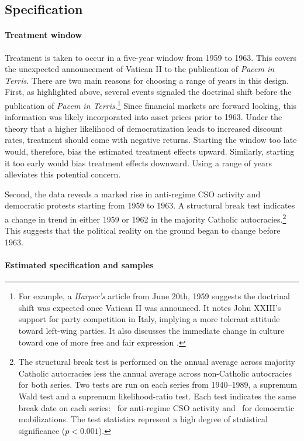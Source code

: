 \subsection{Specification}

\paragraph{Treatment window} 
Treatment is taken to occur in a five-year window from 1959 to 1963. This covers the unexpected announcement of Vatican II to the publication of \textit{Pacem in Terris}. There are two main reasons for choosing a range of years in this design. First, as highlighted above, several events signaled the doctrinal shift before the publication of \textit{Pacem in Terris}.\footnote{For example, a \textit{Harper's} article from June 20th, 1959 suggests the doctrinal shift was expected once Vatican II was announced. It notes John XXIII's support for party competition in Italy, implying a more tolerant attitude toward left-wing parties. It also discusses the immediate change in culture toward one of more free and fair expression \citep{Neville1959}.}
 Since financial markets are forward looking, this information was likely incorporated into asset prices prior to 1963. Under the theory that a higher likelihood of democratization leads to increased discount rates, treatment should come with negative returns. Starting the window too late would, therefore, bias the estimated treatment effects upward. Similarly, starting it too early would bias treatment effects downward. Using a range of years alleviates this potential concern.

Second, the data reveals a marked rise in anti-regime CSO activity and democratic protests starting from 1959 to 1963. A structural break test indicates a change in trend in either 1959 or 1962 in the majority Catholic autocracies.\footnote{The structural break test is performed on the annual average across majority Catholic autocracies less the annual average across non-Catholic autocracies for both series. Two tests are run on each series from 1940--1989, a supremum Wald test and a supremum likelihood-ratio test. Each test indicates the same break date on each series: \figFiveBreakCSO\ for anti-regime CSO activity and \figFiveBreakMob\ for democratic mobilizations. The test statistics represent a high degree of statistical significance ($p<0.001$).} This suggests that the political reality on the ground began to change before 1963.

\paragraph{Estimated specification and samples}

